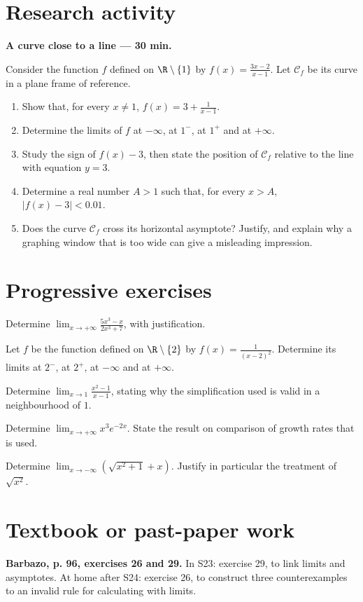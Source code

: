 \mxnewpage
\section{Research activity}\textbf{A curve close to a line --- 30 min.}\par Consider the function $f$ defined on $\R\setminus\{1\}$ by $f(x)=\frac{3x-2}{x-1}$. Let $\mathcal C_f$ be its curve in a plane frame of reference.
\begin{enumerate}\item Show that, for every $x\ne1$, $f(x)=3+\frac1{x-1}$.
\item Determine the limits of $f$ at $-\infty$, at $1^-$, at $1^+$ and at $+\infty$.
\item Study the sign of $f(x)-3$, then state the position of $\mathcal C_f$ relative to the line with equation $y=3$.
\item Determine a real number $A>1$ such that, for every $x>A$, $|f(x)-3|<\num{0,01}$.
\item Does the curve $\mathcal C_f$ cross its horizontal asymptote? Justify, and explain why a graphing window that is too wide can give a misleading impression.\end{enumerate}

\mxnewpage
\section{Progressive exercises}

Determine $\displaystyle\lim_{x\to+\infty}\frac{5x^3-x}{2x^3+7}$, with justification.

Let $f$ be the function defined on $\R\setminus\{2\}$ by $f(x)=\frac1{(x-2)^2}$. Determine its limits at $2^-$, at $2^+$, at $-\infty$ and at $+\infty$.

Determine $\displaystyle\lim_{x\to1}\frac{x^2-1}{x-1}$, stating why the simplification used is valid in a neighbourhood of $1$.

Determine $\displaystyle\lim_{x\to+\infty}x^3e^{-2x}$. State the result on comparison of growth rates that is used.

Determine $\displaystyle\lim_{x\to-\infty}\left(\sqrt{x^2+1}+x\right)$. Justify in particular the treatment of $\sqrt{x^2}$.

\section{Textbook or past-paper work}\textbf{Barbazo, p. 96, exercises 26 and 29.} In S23: exercise 29, to link limits and asymptotes. At home after S24: exercise 26, to construct three counterexamples to an invalid rule for calculating with limits.

